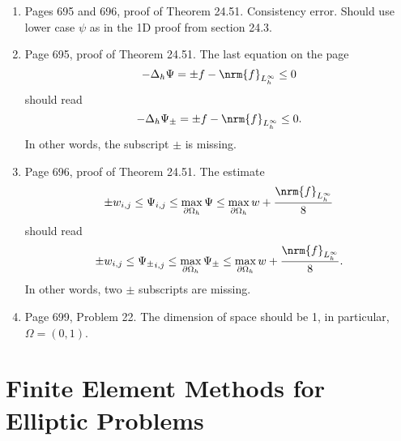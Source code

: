 \documentclass{book}
\begin{document}
\begin{enumerate}
	
	
	\item
Pages 695 and 696, proof of Theorem 24.51. Consistency error. Should use lower case $\psi$ as in the 1D proof from section 24.3.

	\item
Page 695, proof of Theorem 24.51. The last equation on the page 
	\[
-\Delta_h \Psi = \pm f - \nrm{f}_{L_h^\infty} \le 0	
	\]
should read
	\[
-\Delta_h \Psi_{\pm} = \pm f - \nrm{f}_{L_h^\infty} \le 0.	
	\]
In other words, the subscript $\pm$ is missing.
	
	\item
Page 696, proof of Theorem 24.51. The estimate 
	\[
\pm w_{i,j} \le \Psi_{i,j} \le \max_{\partial\Omega_h} \Psi \le \max_{\partial\Omega_h} w + \frac{\nrm{f}_{L_h^\infty}}{8}
	\]
should read
	\[
\pm w_{i,j} \le {\Psi_{\pm}}_{i,j} \le \max_{\partial\Omega_h} \Psi_{\pm} \le \max_{\partial\Omega_h} w + \frac{\nrm{f}_{L_h^\infty}}{8}.
	\]
In other words, two $\pm$ subscripts are missing.
 
	\item
Page 699, Problem 22. The dimension of space should be 1, in particular, $\Omega = (0,1)$.

	\end{enumerate}
	
\chapter{Finite Element Methods for Elliptic Problems}
\end{document}

